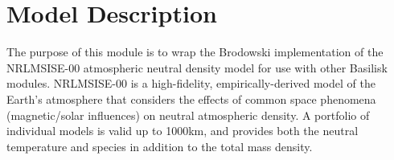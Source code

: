 
\section{Model Description}

The purpose of this module is to wrap the Brodowski implementation of the NRLMSISE-00 atmospheric neutral density model for use with other Basilisk modules. NRLMSISE-00 is a high-fidelity, empirically-derived model of the Earth's atmosphere that considers the effects of common space phenomena (magnetic/solar influences) on neutral atmospheric density. A portfolio of individual models is valid up to 1000km, and provides both the neutral temperature and species in addition to the total mass density.
